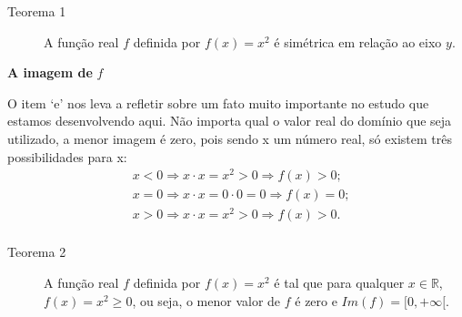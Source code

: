 \begin{description}
\item[Teorema 1]

A função real \(f\) definida por \(f(x)=x^2\) é simétrica em relação ao eixo \(y\).
\end{description}

\textbf{A imagem de} \(f\)

O item ‘e’ nos leva a refletir sobre um fato muito importante no estudo que estamos desenvolvendo aqui. Não importa qual o valor real do domínio que seja utilizado, a menor imagem é zero, pois sendo x um número real, só existem três possibilidades para x:
\begin{equation*}
\begin{split}& x<0 \Rightarrow x \cdot x = x^{2}>0 \Rightarrow f(x)>0;\\
& x=0 \Rightarrow x \cdot x = 0 \cdot 0 =0 \Rightarrow f(x)=0;\\
& x>0 \Rightarrow x \cdot x = x^{2}>0 \Rightarrow f(x)>0.\\\end{split}
\end{equation*}
\begin{description}
\item[Teorema 2]

A função real \(f\) definida por \(f(x)=x^2\) é tal que para qualquer \(x \in \mathbb{R}\), \(f(x) = x^{2} \ge 0\), ou seja, o menor valor de \(f\) é zero e \(Im(f) = [0, +\infty[\).
\end{description}

